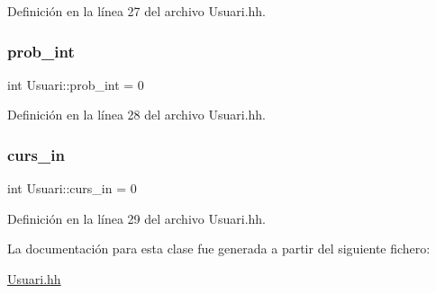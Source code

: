 Definición en la línea 27 del archivo Usuari.\+hh.

\mbox{\label{class_usuari_aaa3eaa2693fa0338801e8333f0e645c4}} 
\subsubsection{\texorpdfstring{prob\+\_\+int}{prob\_int}}
{\footnotesize\ttfamily int Usuari\+::prob\+\_\+int = 0}



Definición en la línea 28 del archivo Usuari.\+hh.

\mbox{\label{class_usuari_ab3acdd111ad583247d29b4bdddd7ab69}} 
\subsubsection{\texorpdfstring{curs\+\_\+in}{curs\_in}}
{\footnotesize\ttfamily int Usuari\+::curs\+\_\+in = 0}



Definición en la línea 29 del archivo Usuari.\+hh.



La documentación para esta clase fue generada a partir del siguiente fichero\+:\begin{DoxyCompactItemize}
\item 
\mbox{\hyperlink{_usuari_8hh}{Usuari.\+hh}}\end{DoxyCompactItemize}
